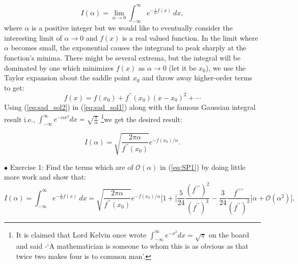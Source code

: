 \documentclass[letter,11pt]{article}
\begin{document}
\begin{equation}
\label{eq:SP1} 
I(\alpha) = \lim_{\alpha \to 0} \int_{-\infty}^{\infty} e^{-\frac{1}{\alpha}f(x)} ~dx, 
\end{equation}
where $\alpha$ is a positive integer but we would like to eventually consider the interesting limit 
of $\alpha \to 0$ and $f(x)$ is a real valued function. In the limit where $\alpha$ becomes small, 
the exponential causes the integrand to peak sharply at the function's minima. There might be several extrema, but the integral will be dominated by one which minimizes $f(x)$ as $\alpha \to 0$ (let it be $x_{0}$), 
we use the Taylor expansion about the saddle point $x_{0}$ and throw away higher-order terms to get:
\begin{equation}
	\label{eq:sad_sol2}
	f(x) = f(x_{0}) + f^{\prime\prime}(x_{0}) (x-x_0)^{2} + \cdots 
\end{equation}
Using (\ref{eq:sad_sol2}) in (\ref{eq:sad_sol1}) along with the famous Gaussian integral result 
i.e., $\int_{-\infty}^{\infty} e^{-\alpha x^2} dx = \sqrt{\frac{\pi}{\alpha}}$
\footnote{It is claimed that Lord Kelvin once wrote $\int_{-\infty}^{\infty}e^{-x^2} dx = \sqrt{\pi}$ on the board 
and said -`A mathematician is someone to whom this is as obvious as that 
twice two makes four is to common man'.}we get the desired result:

\begin{equation}
	\label{eq:sad_sol1} 
	I(\alpha) =  \sqrt{\frac{2\pi \alpha}{f^{\prime\prime}(x_{0})}} e^{-f(x_{0})/\alpha}. 
\end{equation}



\begin{mdframed}[backgroundcolor=blue!3] 
	\textsc{} 
	$\bullet$ Exercise 1: Find the terms which are of $\mathcal{O}(\alpha)$ in (\ref{eq:SP1}) by doing little more work and show that:
	\begin{equation*}
	I(\alpha) = \int_{-\infty}^{\infty} e^{-\frac{1}{\alpha}f(x)} ~dx = \sqrt{\frac{2\pi \alpha}{f^{\prime\prime}(x_{0})}} e^{-f(x_{0})/\alpha} \Bigg[1 + 
	\Big[ \frac{5}{24} \frac{(f^{\prime\prime\prime})^2}{(f^{\prime\prime})^3} - \frac{3}{24} \frac{f^{\prime\prime\prime\prime}}{(f^{\prime\prime})^2}\Big] \alpha + \mathcal{O}(\alpha^{2})\Bigg]. 
	\end{equation*}	
\end{mdframed} 
\end{document}

